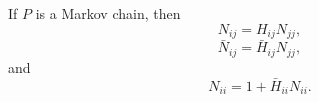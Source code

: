 If $P$ is a Markov chain, then
$$N_{ij} = H_{ij} N_{jj},$$
$$\bar{N}_{ij} = \bar{H}_{ij} N_{jj},$$
and
$$N_{ii} = 1 + \bar{H}_{ii} N_{ii}.$$
